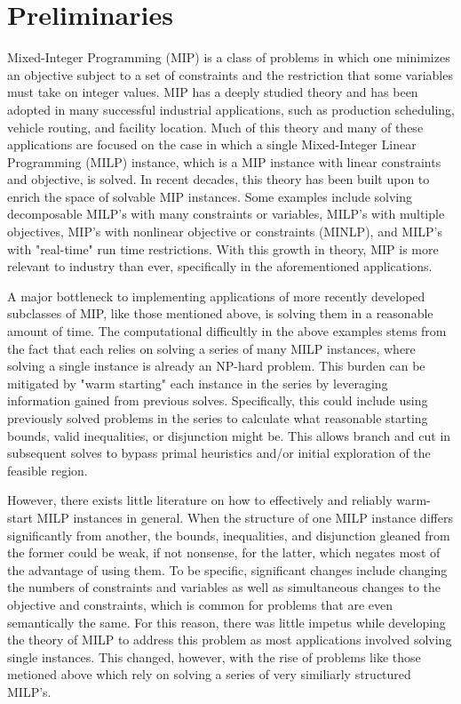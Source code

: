 \documentclass[10pt]{article}
\begin{document}
	\section{Preliminaries} \label{s:prelims}
	Mixed-Integer Programming (MIP) is a class of problems in which one minimizes an objective subject to a set of constraints and the restriction that some variables must take on integer values. MIP has a deeply studied theory and has been adopted in many successful industrial applications, such as production scheduling, vehicle routing, and facility location. Much of this theory and many of these applications are focused on the case in which a single Mixed-Integer Linear Programming (MILP) instance, which is a MIP instance with linear constraints and objective, is solved. In recent decades, this theory has been built upon to enrich the space of solvable MIP instances. Some examples include solving decomposable MILP's with many constraints or variables, MILP's with multiple objectives, MIP's with nonlinear objective or constraints (MINLP), and MILP's with "real-time" run time restrictions. With this growth in theory, MIP is more relevant to industry than ever, specifically in the aforementioned applications. 
	
	A major bottleneck to implementing applications of more recently developed subclasses of MIP, like those mentioned above, is solving them in a reasonable amount of time. The computational difficultly in the above examples stems from the fact that each relies on solving a series of many MILP instances, where solving a single instance is already an NP-hard problem. This burden can be mitigated by "warm starting" each instance in the series by leveraging information gained from previous solves. Specifically, this could include using previously solved problems in the series to calculate what reasonable starting bounds, valid inequalities, or disjunction might be. This allows branch and cut in subsequent solves to bypass primal heuristics and/or initial exploration of the feasible region.
	
	However, there exists little literature on how to effectively and reliably warm-start MILP instances in general. When the structure of one MILP instance differs significantly from another, the bounds, inequalities, and disjunction gleaned from the former could be weak, if not nonsense, for the latter, which negates most of the advantage of using them. To be specific, significant changes include changing the numbers of constraints and variables as well as simultaneous changes to the objective and constraints, which is common for problems that are even semantically the same. For this reason, there was little impetus while developing the theory of MILP to address this problem as most applications involved solving single instances. This changed, however, with the rise of problems like those metioned above which rely on solving a series of very similiarly structured MILP's.
	
\end{document}
